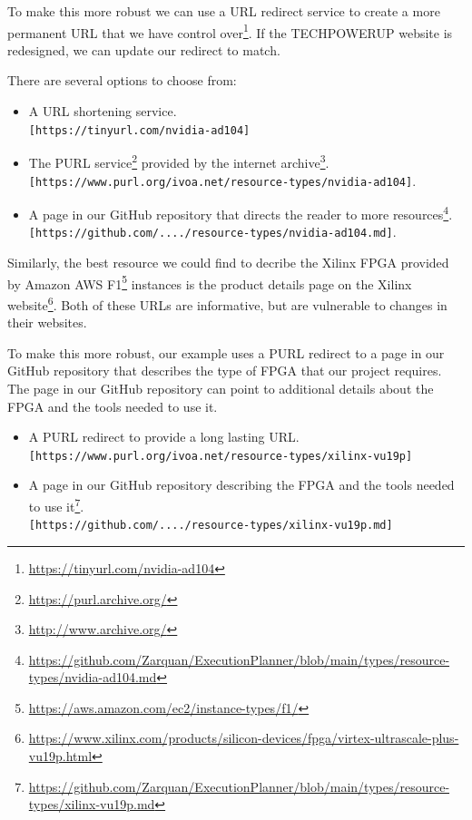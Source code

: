 \documentclass[11pt,a4paper]{ivoa}
\newcommand{\codeword}[1] {\texttt{#1}}
\newcommand{\footurl}[1] {\footnote{\url{#1}}}
\begin{document}
To make this more robust we can use a URL redirect service to create a more permanent
URL that we have control over\footurl{https://tinyurl.com/nvidia-ad104}.
If the TECHPOWERUP website is redesigned, we can update
our redirect to match.

There are several options to choose from:
\begin{itemize}
\item A URL shortening service.\\
      \codeword{[https://tinyurl.com/nvidia-ad104]}
\item The PURL service\footurl{https://purl.archive.org/} provided by the internet archive\footurl{http://www.archive.org/}.\\
      \codeword{[https://www.purl.org/ivoa.net/resource-types/nvidia-ad104]}.
\item A page in our GitHub repository that directs the reader to more resources\footurl{https://github.com/Zarquan/ExecutionPlanner/blob/main/types/resource-types/nvidia-ad104.md}.\\
      \codeword{[https://github.com/..../resource-types/nvidia-ad104.md]}.
\end{itemize}

Similarly, the best resource we could find to decribe the Xilinx FPGA provided by Amazon AWS
F1\footurl{https://aws.amazon.com/ec2/instance-types/f1/} instances is the product details
page on the Xilinx website\footurl{https://www.xilinx.com/products/silicon-devices/fpga/virtex-ultrascale-plus-vu19p.html}.
Both of these URLs are informative, but are vulnerable to changes in their websites.

To make this more robust, our example uses a PURL redirect to a page in our GitHub repository that describes
the type of FPGA that our project requires. The page in our GitHub repository can point to additional details about the
FPGA and the tools needed to use it.
\begin{itemize}
\item A PURL redirect to provide a long lasting URL.\\
      \codeword{[https://www.purl.org/ivoa.net/resource-types/xilinx-vu19p]}
\item A page in our GitHub repository describing the FPGA and the tools needed to use it\footurl{https://github.com/Zarquan/ExecutionPlanner/blob/main/types/resource-types/xilinx-vu19p.md}.\\
      \codeword{[https://github.com/..../resource-types/xilinx-vu19p.md]}
\end{itemize}
\end{document}
